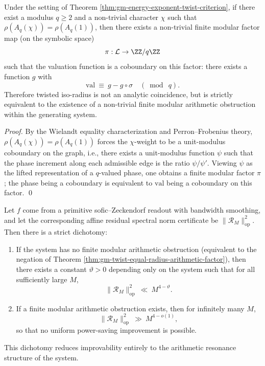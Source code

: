 \begin{theorem}\label{thm:gm-twist-equal-radius-arithmetic-factor}
Under the setting of Theorem \ref{thm:gm-energy-exponent-twist-criterion}, if there exist a modulus \(q\ge 2\) and a non-trivial character \(\chi\) such that \(\rho(A_q(\chi))=\rho(A_q(1))\), then there exists a non-trivial finite modular factor map (on the symbolic space)
\[
\pi:\mathcal{L}\to\ZZ/q\ZZ
\]
such that the valuation function is a coboundary on this factor: there exists a function \(g\) with
\[
\mathrm{val}\ \equiv\ g-g\circ\sigma\quad (\bmod\ q).
\]
Therefore twisted iso-radius is not an analytic coincidence, but is strictly equivalent to the existence of a non-trivial finite modular arithmetic obstruction within the generating system.
\end{theorem}

\begin{proof}
By the Wielandt equality characterization and Perron--Frobenius theory, \(\rho(A_q(\chi))=\rho(A_q(1))\) forces the \(\chi\)-weight to be a unit-modulus coboundary on the graph, i.e., there exists a unit-modulus function \(\psi\) such that the phase increment along each admissible edge is the ratio \(\psi/\psi'\).
Viewing \(\psi\) as the lifted representation of a \(q\)-valued phase, one obtains a finite modular factor \(\pi\); the phase being a coboundary is equivalent to \(\mathrm{val}\) being a coboundary on this factor. \qed
\end{proof}

\begin{theorem}\label{thm:gm-affine-improvement-dichotomy}
Let \(f\) come from a primitive sofic--Zeckendorf readout with bandwidth smoothing, and let the corresponding affine residual spectral norm certificate be \(\|\mathcal{R}_M\|_{\mathrm{op}}^2\).
Then there is a strict dichotomy:
\begin{enumerate}
  \item If the system has no finite modular arithmetic obstruction (equivalent to the negation of Theorem \ref{thm:gm-twist-equal-radius-arithmetic-factor}), then there exists a constant \(\vartheta>0\) depending only on the system such that for all sufficiently large \(M\),
  \[
  \|\mathcal{R}_M\|_{\mathrm{op}}^2\ \ll\ M^{4-\vartheta}.
  \]
  \item If a finite modular arithmetic obstruction exists, then for infinitely many \(M\),
  \[
  \|\mathcal{R}_M\|_{\mathrm{op}}^2\ \gg\ M^{4-o(1)},
  \]
  so that no uniform power-saving improvement is possible.
\end{enumerate}
This dichotomy reduces improvability entirely to the arithmetic resonance structure of the system.
\end{theorem}

